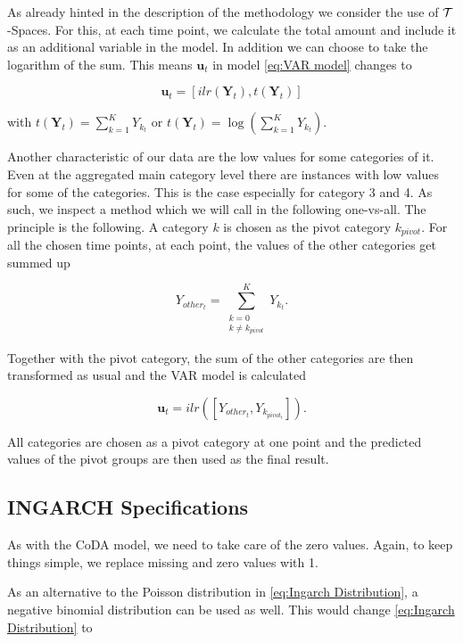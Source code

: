 As already hinted in the description of the methodology we consider the use of $\mathcal{T}$-Spaces. For this, at each time point, we calculate the total amount and include it as an additional variable in the model. In addition we can choose to take the logarithm of the sum. This means $\bm{u}_t$ in model \ref{eq:VAR model} changes to 

\begin{equation*}
\bm{u}_t = [ilr(\bm{Y}_t),t(\bm{Y}_t)]
\label{eq:Tspace u}
\end{equation*}

with $t(\bm{Y}_t) = \sum_{k=1}^K Y_{k_t}$ or $t(\bm{Y}_t) = \log\left(\sum_{k=1}^K Y_{k_t}\right)$.

Another characteristic of our data are the low values for some categories of it. Even at the aggregated main category level there are instances with low values for some of the categories. This is the case especially for category 3 and 4. As such, we inspect a method which we will call in the following one-vs-all. The principle is the following. A category $k$ is chosen as the pivot category $k_{pivot}$. For all the chosen time points, at each point, the values of the other categories get summed up

\begin{equation*}
Y_{other_t} = \sum_{\substack{k=0 \\ k \neq k_{pivot}}}^K Y_{k_t}.
\label{eq:one vs all}
\end{equation*}

Together with the pivot category, the sum of the other categories are then transformed as usual and the VAR model is calculated 

\begin{equation*}
\bm{u}_t = ilr([Y_{other_t}, Y_{k_{pivot_t}}]).
\label{eq:one vs all ilr}
\end{equation*}


All categories are chosen as a pivot category at one point and the predicted values of the pivot groups are then used as the final result. 


\subsection{INGARCH Specifications}
\label{sec: Ingarch Specifications}

As with the CoDA model, we need to take care of the zero values. Again, to keep things simple, we replace missing and zero values with 1. 

As an alternative to the Poisson distribution in \ref{eq:Ingarch Distribution}, a negative binomial distribution can be used as well. This would change \ref{eq:Ingarch Distribution} to 

